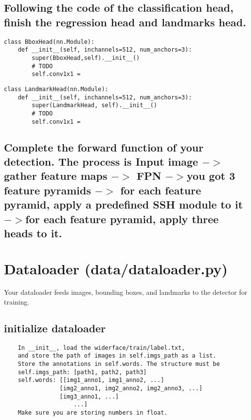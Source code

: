 \documentclass[11pt,addpoints,answers]{exam}
\begin{document}
\subsection{Following the code of the classification head, finish the regression head and
landmarks head.}

\begin{solution*}{}

\begin{verbatim}
class BboxHead(nn.Module):
    def __init__(self, inchannels=512, num_anchors=3):
        super(BboxHead,self).__init__()
        # TODO
        self.conv1x1 =

\end{verbatim}

\begin{verbatim}
class LandmarkHead(nn.Module):
    def __init__(self, inchannels=512, num_anchors=3):
        super(LandmarkHead, self).__init__()
        # TODO
        self.conv1x1 =
\end{verbatim}
        
\end{solution*}

\subsection{Complete the forward function of your detection. The process is Input image
 $->$ gather feature maps  $->$ FPN $->$you got 3 feature pyramids  $->$ for each feature
pyramid, apply a predefined SSH module to it  $->$for each feature pyramid, apply
three heads to it.}


\section{Dataloader (data/dataloader.py)}
Your dataloader feeds images, bounding boxes, and landmarks to the detector for
training.

\subsection{initialize dataloader}

\begin{verbatim}
    In __init__, load the widerface/train/label.txt, 
    and store the path of images in self.imgs_path as a list. 
    Store the annotations in self.words. The structure must be
    self.imgs_path: [path1, path2, path3]
    self.words: [[img1_anno1, img1_anno2, ...]
                [img2_anno1, img2_anno2, img2_anno3, ...]
                [img3_anno1, ...]
                    ...]
    Make sure you are storing numbers in float.
\end{verbatim}
\end{document}
